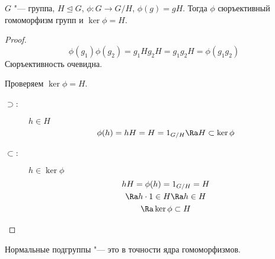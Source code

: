\begin{theorem}
	$G$ "--- группа, $H \unlhd G$,
	$\phi \colon G \to G / H$,
	$\phi(g) = gH$.
	Тогда $\phi$ сюръективный гомоморфизм групп и $\ker \phi = H$.
\end{theorem}
\begin{proof}
	\[ \phi(g_1)\phi(g_2) = g_1Hg_2H = g_1g_2H = \phi(g_1g_2) \]
	Сюръективность очевидна. 

	Проверяем $\ker \phi = H$.
	\begin{description}
	\item[$\supset$:]
		$h \in H$
		\[ \phi(h) = hH =  H = 1_{G/H} \Ra H \subset \ker \phi \]

	\item[$\subset$:]
		$h \in \ker \phi$
		\begin{gather*}
			hH = \phi(h) = 1_{G/H} = H \\
			\Ra h\cdot1 \in H \Ra h \in H \\
			\Ra \ker \phi \subset H
		\end{gather*}
	\end{description}
\end{proof}

\begin{conseq}
	Нормальные подгруппы "--- это в точности ядра гомоморфизмов.
\end{conseq}
